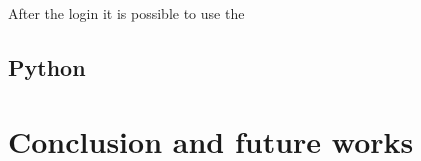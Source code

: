 After the login it is possible to use the 

\label{sec:python}
\subsection{Python}

\label{sec:conclusion}
\section{Conclusion and future works}

